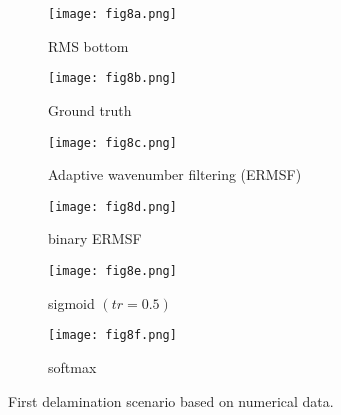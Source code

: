 	\begin{figure} [!h]
		\centering
		\begin{subfigure}[b]{0.47\textwidth}
			\centering
			\texttt{[image: fig8a.png]}
			\caption{RMS bottom}
			\label{fig:RMS_flat_shell_Vz_438}
		\end{subfigure}
		\hfill
			\begin{subfigure}[b]{0.47\textwidth}
			\centering
			\texttt{[image: fig8b.png]}
			\caption{Ground truth}
			\label{fig:m1_rand_single_delam_438}
		\end{subfigure}
		\hfill
		\begin{subfigure}[b]{0.47\textwidth}
			\centering
			\texttt{[image: fig8c.png]}
			\caption{Adaptive wavenumber filtering (ERMSF)}
			\label{fig:ERMSF_flat_shell_Vz_438}
		\end{subfigure}
		\hfill
		\begin{subfigure}[b]{0.47\textwidth}
			\centering
			\texttt{[image: fig8d.png]}
			\caption{binary ERMSF}
			\label{fig:Binary_ERMSF_flat_shell_Vz_438}
		\end{subfigure}
		\hfill
		\begin{subfigure}[b]{0.47\textwidth}
			\centering
		\texttt{[image: fig8e.png]}
		\caption{sigmoid \((tr = 0.5)\)}
		\label{fig:predict_438_sigmoid_tr_0.5}
		\end{subfigure}
		\hfill
		\begin{subfigure}[b]{0.47\textwidth}
			\centering
			\texttt{[image: fig8f.png]}
			\caption{softmax}
			\label{fig:predict_438_softmax}
		\end{subfigure}
		\caption{First delamination scenario based on numerical data.}
		\label{fig:RMS438}
	\end{figure} 
	
